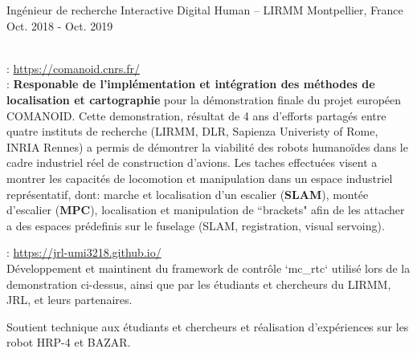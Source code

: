 \begin{cventries}
  \cventry
    {Ingénieur de recherche} %
    {Interactive Digital Human -- LIRMM} %
    {Montpellier, France} %
    {Oct. 2018 - Oct. 2019} %
    {
      \begin{cvitems} %
        \item {}\\
          : \url{https://comanoid.cnrs.fr/}\\
          : \textbf{Responable de l'implémentation et intégration des méthodes de localisation et cartographie} pour la démonstration finale du projet européen COMANOID. Cette demonstration, résultat de 4 ans d'efforts partagés entre quatre instituts de recherche (LIRMM, DLR, Sapienza Univeristy of Rome, INRIA Rennes) a permis de démontrer la viabilité des robots humanoïdes dans le cadre industriel réel de construction d'avions. Les taches effectuées visent a montrer les capacités de locomotion et manipulation dans un espace industriel représentatif, dont: marche et localisation d'un escalier (\textbf{SLAM}), montée d'escalier (\textbf{MPC}), localisation et manipulation de ``brackets" afin de les attacher a des espaces prédefinis sur le fuselage (SLAM, registration, visual servoing).
        \item {}: \url{https://jrl-umi3218.github.io/}\\
        Développement et maintinent du framework de contrôle `mc\_rtc` utilisé lors de la demonstration ci-dessus, ainsi que par les étudiants et chercheurs du LIRMM, JRL, et leurs partenaires.
        \item Soutient technique aux étudiants et chercheurs et réalisation d'expériences sur les robot HRP-4 et BAZAR.
      \end{cvitems}
    }




\end{cventries}
